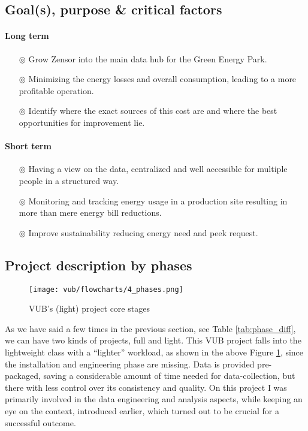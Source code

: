 \subsection{Goal(s), purpose \& critical factors}
\paragraph{Long term}
\begin{itemize}
    \item[$\circledcirc$] Grow Zensor into the main data hub for the Green Energy Park.
    \item[$\circledcirc$] Minimizing the energy losses and overall consumption, leading to a more profitable operation.
    \item[$\circledcirc$] Identify where the exact sources of this cost are and where the best opportunities for improvement lie.
\end{itemize}
\clearpage
\paragraph{Short term}
\begin{itemize}
    \item[$\circledcirc$] Having a view on the data, centralized and well accessible for multiple people in a structured way.
    \item[$\circledcirc$] Monitoring and tracking energy usage in a production site resulting in more than mere energy bill reductions.
    \item[$\circledcirc$] Improve sustainability reducing energy need and peek request. 
\end{itemize}

\subsection{Project description by phases}
\begin{figure}[ht]
    \texttt{[image: vub/flowcharts/4\_phases.png]}
    \caption{\ac{VUB}'s (light) project core stages}
    \label{fig:vub_stages}
\end{figure}
As we have said a few times in the previous section, see Table \ref{tab:phase_diff}, we can have two kinds of projects, full and light. 
This \ac{VUB} project falls into the lightweight class with a ``lighter'' workload, as shown in the above Figure \ref{fig:vub_stages}, since the installation and engineering phase are missing. 
Data is provided pre-packaged, saving a considerable amount of time needed for data-collection, but there with less control over its consistency and quality.
On this project I was primarily involved in the data engineering and analysis aspects, while keeping an eye on the context, introduced earlier, which turned out to be crucial for a successful outcome.

